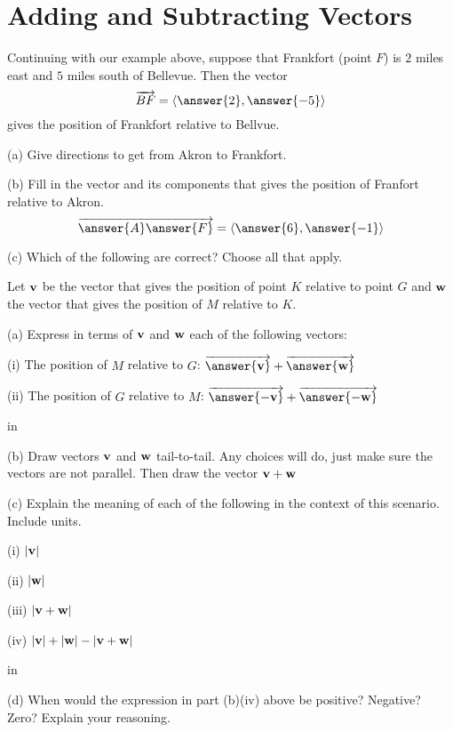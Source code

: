 \documentclass{ximera}
\newcommand{\pskip}{\vskip 0.1 in}
\begin{document}
\section{Adding and Subtracting Vectors}

\begin{question}    \label{Q234234:Vectors}
Continuing with our example above, suppose that Frankfort (point $F$) is $2$ miles east and $5$ miles south of Bellevue. Then the vector
\[
    \overrightarrow{BF}  = \langle \answer{2}, \answer{-5}\rangle
\]
gives the position of Frankfort relative to Bellvue. 
\end{question}

\begin{question} \label{Q233:Vectors}
(a) Give directions to get from Akron to Frankfort.

(b) Fill in the vector and its components that gives the position of Franfort relative to Akron.
\[
       \overrightarrow{\answer{A} \answer{F}}    =  \langle  \answer{6} , \answer{-1}  \rangle 
\]

(c) Which of the following are correct? Choose all that apply.
\begin{selectAll}  
\end{selectAll} 


\end{question}


\begin{question}  \label{Q543:Vectors}
Let ${\bf v}$ be the vector that gives the position of point $K$ relative to point $G$ and ${\bf w}$ the vector that gives the position of $M$ relative to $K$. 

(a) Express in terms of ${\bf v}$ and ${\bf w}$ each of the following vectors: 

(i) The position of $M$ relative to $G$:  $\overrightarrow{\bf \answer{v}} +  \overrightarrow{\bf \answer{w}} $

(ii) The position of $G$ relative to $M$:  $\overrightarrow{\bf \answer{-v}} +  \overrightarrow{\bf \answer{-w}} $

\pskip

(b) Draw vectors ${\bf v}$ and ${\bf w}$ tail-to-tail. Any choices will do, just make sure the vectors are not parallel. Then draw the vector ${\bf v} + {\bf w}$

(c) Explain the meaning of each of the following in the context of this scenario. Include units. 

(i) $|  {\bf v} |$

(ii) $|  {\bf w} |$

(iii) $|  {\bf v+w} |$

(iv) $|  {\bf v} | + |  {\bf w} | - |  {\bf v+w} |$

\pskip

(d) When would the expression in part (b)(iv) above be positive? Negative? Zero? Explain your reasoning. 

\end{question}
\end{document}
